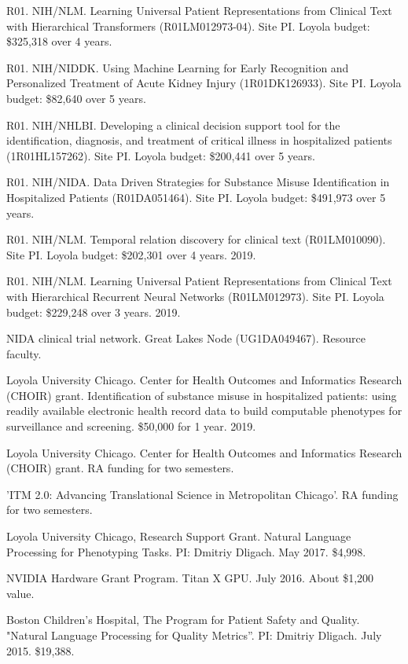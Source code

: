 \documentclass[letterpaper]{article}
\renewenvironment{itemize}{
  \begin{list}{}{
    \setlength{\leftmargin}{1.5em}
  }
}{
  \end{list}
}
\begin{document}
\begin{itemize}
\item R01. NIH/NLM. Learning Universal Patient Representations from Clinical Text with Hierarchical Transformers (R01LM012973-04). Site PI. Loyola budget: \$325,318 over 4 years.
\item R01. NIH/NIDDK. Using Machine Learning for Early Recognition and Personalized Treatment of Acute Kidney Injury (1R01DK126933). Site PI. Loyola budget: \$82,640 over 5 years.
\item R01. NIH/NHLBI. Developing a clinical decision support tool for the identification, diagnosis, and treatment of critical illness in hospitalized patients (1R01HL157262). Site PI. Loyola budget: \$200,441 over 5 years.
\item R01. NIH/NIDA. Data Driven Strategies for Substance Misuse Identification in Hospitalized Patients (R01DA051464). Site PI. Loyola budget: \$491,973 over 5 years.
\item R01. NIH/NLM. Temporal relation discovery for clinical text (R01LM010090). Site PI. Loyola budget: \$202,301 over 4 years. 2019.
\item R01. NIH/NLM. Learning Universal Patient Representations from Clinical Text with Hierarchical Recurrent Neural Networks (R01LM012973). Site PI. Loyola budget: \$229,248 over 3 years. 2019.
\item NIDA clinical trial network. Great Lakes Node (UG1DA049467). Resource faculty.
\item Loyola University Chicago. Center for Health Outcomes and Informatics Research (CHOIR) grant. Identification of substance misuse in hospitalized patients: using readily available electronic health record data to build computable phenotypes for surveillance and screening. \$50,000 for 1 year. 2019.
\item Loyola University Chicago. Center for Health Outcomes and Informatics Research (CHOIR) grant. RA funding for two semesters.
\item 'ITM 2.0: Advancing Translational Science in Metropolitan Chicago'. RA funding for two semesters.
\item Loyola University Chicago, Research Support Grant. Natural Language Processing for Phenotyping Tasks. PI: Dmitriy Dligach. May 2017. \$4,998.
\item NVIDIA Hardware Grant Program. Titan X GPU. July 2016. About \$1,200 value.
\item Boston Children's Hospital, The Program for Patient Safety and Quality. "Natural Language Processing for Quality Metrics''. PI: Dmitriy Dligach. July 2015. \$19,388.
\end{itemize}
\end{document}
